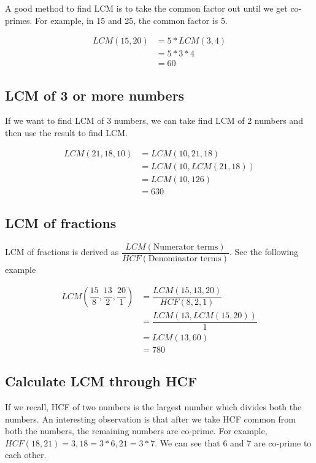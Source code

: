 \begin{EXTRA-LEARNING}
    A good method to find LCM is to take the common factor out until we get co-primes. For example, in 15 and 25, the common factor is 5. 

    \begin{align*}
        LCM(15,20) &= 5 * LCM(3,4) \\
        &= 5 * 3 * 4 \tag{As 3 and 4 are co-prime} \\
        &= 60
    \end{align*}
\end{EXTRA-LEARNING}

\subsection{LCM of 3 or more numbers}

If we want to find LCM of 3 numbers, we can take find LCM of 2 numbers and then use the result to find LCM. 

\begin{align*}
    LCM(21,18,10) &= LCM(10,21,18) \\
    &= LCM(10,LCM(21,18)) \\
    &= LCM(10,126) \tag{$3 * LCM(7,6) = 3 * 7 * 6 = 126$} \\
    &= 630 \tag{$2 * LCM(5,63) = 630$}
\end{align*}

\subsection{LCM of fractions}

LCM of fractions is derived as $\dfrac{LCM(\text{Numerator terms})}{HCF(\text{Denominator terms})}$. See the following example


\begin{align*}
    LCM(\dfrac{15}{8}, \dfrac{13}{2}, \dfrac{20}{1}) &= \dfrac{LCM(15,13,20)}{HCF(8,2,1)} \\
    &= \dfrac{LCM(13,LCM(15,20))}{1} \\
    &= LCM(13,60) \\
    &= 780
\end{align*}

\subsection{Calculate LCM through HCF}
If we recall, HCF of two numbers is the largest number which divides both the numbers. An interesting observation is that after we take HCF common from both the numbers, the remaining numbers are co-prime. For example, $HCF(18,21) = 3, 18 = 3 * 6, 21 = 3 * 7.$ We can see that 6 and 7 are co-prime to each other. \\

